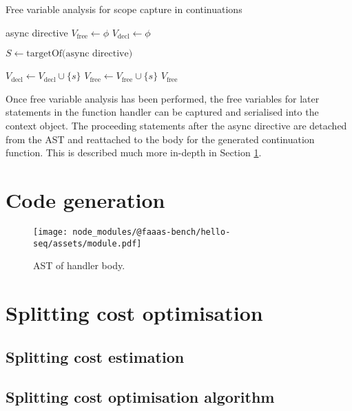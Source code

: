 \begin{algorithm}
\caption{Free variable analysis for scope capture in continuations}
\label{alg:free-variable-analysis}
\begin{algorithmic}[1]
\Require async directive
\State $V_\mathrm{free} \gets \phi$
\State $V_\mathrm{decl} \gets \phi$

\State $S \gets \textrm{targetOf(async directive)}$

        \State $V_\mathrm{decl} \gets V_\mathrm{decl} \cup \{s\}$
            \State $V_\mathrm{free} \gets V_\mathrm{free} \cup \{s\}$
        \EndIf
    \EndIf
\EndFor
\Ensure $V_\mathrm{free}$
\end{algorithmic}
\end{algorithm}

Once free variable analysis has been performed, the free variables for later statements in the function handler can be captured and serialised into the context object. The proceeding statements after the async directive are detached from the AST and reattached to the body for the generated continuation function. This is described much more in-depth in Section \ref{sec:faaasc-codegen-ast}.

\section{Code generation}
\label{sec:faaasc-codegen-ast}

\begin{figure}[t]
    \texttt{[image: node\_modules/@faaas-bench/hello-seq/assets/module.pdf]}
    \caption{AST of handler body.}
    \label{fig:suites-hello-seq-module-ast}
\end{figure}

\section{Splitting cost optimisation}

\subsection{Splitting cost estimation}

\subsection{Splitting cost optimisation algorithm}

